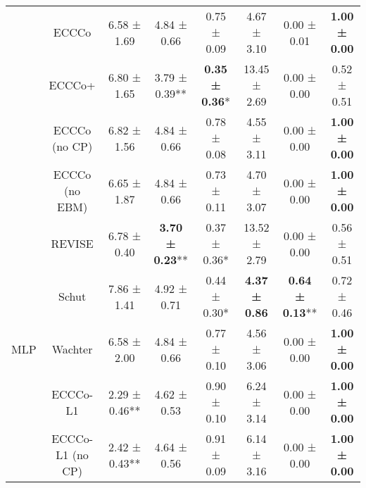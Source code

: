 \begin{table}
{\begin{tabular}[t]{cccccccc}
 & ECCCo & 6.58 ± 1.69\hphantom{*}\hphantom{*} & 4.84 ± 0.66\hphantom{*}\hphantom{*} & 0.75 ± 0.09\hphantom{*}\hphantom{*} & 4.67 ± 3.10\hphantom{*}\hphantom{*} & 0.00 ± 0.01\hphantom{*}\hphantom{*} & \textbf{1.00 ± 0.00}\hphantom{*}\hphantom{*}\\

 & ECCCo+ & 6.80 ± 1.65\hphantom{*}\hphantom{*} & 3.79 ± 0.39** & \textbf{0.35 ± 0.36}*\hphantom{*} & 13.45 ± 2.69\hphantom{*}\hphantom{*} & 0.00 ± 0.00\hphantom{*}\hphantom{*} & 0.52 ± 0.51\hphantom{*}\hphantom{*}\\

 & ECCCo (no CP) & 6.82 ± 1.56\hphantom{*}\hphantom{*} & 4.84 ± 0.66\hphantom{*}\hphantom{*} & 0.78 ± 0.08\hphantom{*}\hphantom{*} & 4.55 ± 3.11\hphantom{*}\hphantom{*} & 0.00 ± 0.00\hphantom{*}\hphantom{*} & \textbf{1.00 ± 0.00}\hphantom{*}\hphantom{*}\\

 & ECCCo (no EBM) & 6.65 ± 1.87\hphantom{*}\hphantom{*} & 4.84 ± 0.66\hphantom{*}\hphantom{*} & 0.73 ± 0.11\hphantom{*}\hphantom{*} & 4.70 ± 3.07\hphantom{*}\hphantom{*} & 0.00 ± 0.00\hphantom{*}\hphantom{*} & \textbf{1.00 ± 0.00}\hphantom{*}\hphantom{*}\\

 & REVISE & 6.78 ± 0.40\hphantom{*}\hphantom{*} & \textbf{3.70 ± 0.23}** & 0.37 ± 0.36*\hphantom{*} & 13.52 ± 2.79\hphantom{*}\hphantom{*} & 0.00 ± 0.00\hphantom{*}\hphantom{*} & 0.56 ± 0.51\hphantom{*}\hphantom{*}\\

 & Schut & 7.86 ± 1.41\hphantom{*}\hphantom{*} & 4.92 ± 0.71\hphantom{*}\hphantom{*} & 0.44 ± 0.30*\hphantom{*} & \textbf{4.37 ± 0.86}\hphantom{*}\hphantom{*} & \textbf{0.64 ± 0.13}** & 0.72 ± 0.46\hphantom{*}\hphantom{*}\\

\multirow[t]{-10}{*}{\centering\arraybackslash MLP} & Wachter & 6.58 ± 2.00\hphantom{*}\hphantom{*} & 4.84 ± 0.66\hphantom{*}\hphantom{*} & 0.77 ± 0.10\hphantom{*}\hphantom{*} & 4.56 ± 3.06\hphantom{*}\hphantom{*} & 0.00 ± 0.00\hphantom{*}\hphantom{*} & \textbf{1.00 ± 0.00}\hphantom{*}\hphantom{*}\\
\cmidrule{1-8}
 & ECCCo-L1 & 2.29 ± 0.46** & 4.62 ± 0.53\hphantom{*}\hphantom{*} & 0.90 ± 0.10\hphantom{*}\hphantom{*} & 6.24 ± 3.14\hphantom{*}\hphantom{*} & 0.00 ± 0.00\hphantom{*}\hphantom{*} & \textbf{1.00 ± 0.00}\hphantom{*}\hphantom{*}\\

 & ECCCo-L1 (no CP) & 2.42 ± 0.43** & 4.64 ± 0.56\hphantom{*}\hphantom{*} & 0.91 ± 0.09\hphantom{*}\hphantom{*} & 6.14 ± 3.16\hphantom{*}\hphantom{*} & 0.00 ± 0.00\hphantom{*}\hphantom{*} & \textbf{1.00 ± 0.00}\hphantom{*}\hphantom{*}\\


\end{tabular}}
\end{table}
